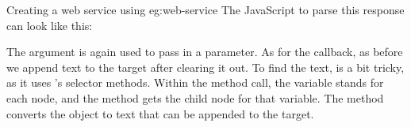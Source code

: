 \begin{example}{Creating a web service using }{eg:web-service}
The JavaScript to parse this response can look like this:
The  argument is again used to pass in a parameter. As for the
 callback, as before we append text to the target after
clearing it out. To find the text, is a bit tricky, as it uses
's selector methods. Within the method call, the variable 
stands for each  node, and the  method gets the
child node for that variable. The  method converts the
object to text that can be appended to the target.
\end{example}










